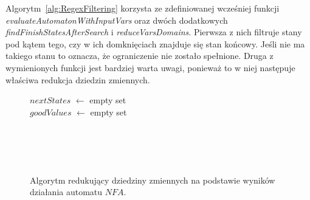 \par
Algorytm~\ref{alg:RegexFiltering} korzysta ze zdefiniowanej wcześniej funkcji \textit{evaluateAutomatonWithInputVars} oraz
dwóch dodatkowych \textit{findFinishStatesAfterSearch} i \textit{reduceVarsDomains}. Pierwsza z nich filtruje stany pod kątem tego,
czy w ich domknięciach znajduje się stan końcowy. Jeśli nie ma takiego stanu to oznacza, że ograniczenie nie zostało spełnione.
Druga z wymienionych funkcji jest bardziej warta uwagi, ponieważ to w niej następuje właściwa redukcja dziedzin zmiennych.
\begin{figure}
	\centering
	{\small
		\begin{pseudokod}[H]
		{
			{
				$nextStates$ $\leftarrow$ empty set \\
				$goodValues$ $\leftarrow$ empty set \\
				{
					{
						 \\
						 \\
					}
				}
				 \\
				 \\
			}
		}
		\caption{Algorytm redukujący dziedziny zmiennych na podstawie wyników działania automatu $NFA$.}
		\label{alg:reduceVarsDomains}
		\end{pseudokod}
	}
\end{figure}

